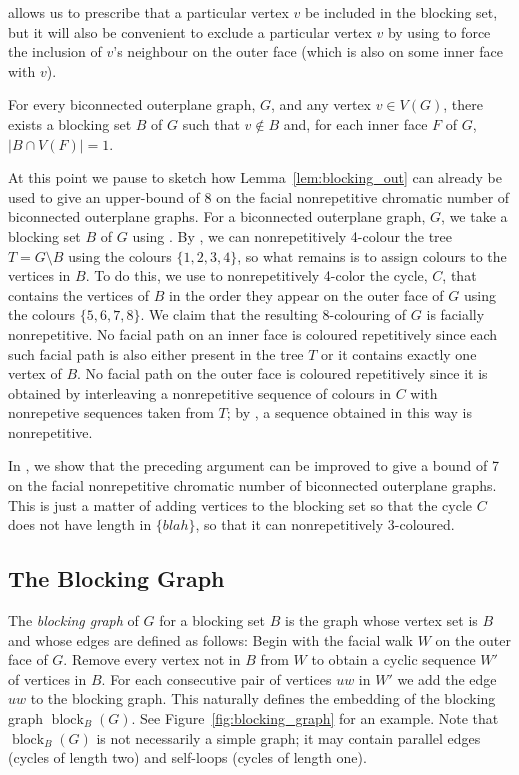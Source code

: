 \documentclass{patmorin}
\DeclareMathOperator{\block}{block}
\begin{document}
 allows us to prescribe that a particular vertex
$v$ be included in the blocking set, but it will also be convenient to
exclude a particular vertex $v$ by using  to force
the inclusion of $v$'s neighbour on the outer face (which is also on
some inner face with $v$).

\begin{cor}
  For every biconnected outerplane graph, $G$, and any vertex $v\in
  V(G)$, there exists a blocking set $B$ of $G$ such that $v\not\in B$ and,
  for each inner face $F$ of $G$, $|B\cap V(F)|=1$.
\end{cor}

At this point we pause to sketch how Lemma~\ref{lem:blocking_out}
can already be used to give an upper-bound of 8 on the facial
nonrepetitive chromatic number of biconnected outerplane graphs.  For a
biconnected outerplane graph, $G$, we take a blocking set $B$ of $G$
using .  By , we can nonrepetitively
4-colour the tree $T=G\setminus B$ using the colours $\{1,2,3,4\}$, so
what remains is to assign colours to the vertices in $B$.  To do this,
we use  to nonrepetitively 4-color the cycle, $C$, that
contains the vertices of $B$ in the order they appear on the outer face
of $G$ using the colours $\{5,6,7,8\}$.  We claim that the resulting
8-colouring of $G$ is facially nonrepetitive.  No facial path on an
inner face is coloured repetitively since each such facial path is also
either present in the tree $T$ or it contains exactly one vertex of $B$.
No facial path on the outer face is coloured repetitively since it is
obtained by interleaving a nonrepetitive sequence of colours in $C$
with nonrepetive sequences taken from $T$; by ,
a sequence obtained in this way is nonrepetitive.

In , we show that the preceding argument can be
improved to give a bound of 7 on the facial nonrepetitive chromatic
number of biconnected outerplane graphs. This is just a matter of adding
vertices to the blocking set so that the cycle $C$ does not have length
in $\{blah\}$, so that it can nonrepetitively 3-coloured. 

\subsection{The Blocking Graph}


The \emph{blocking graph} of $G$ for a blocking set $B$ is the graph
whose vertex set is $B$ and whose edges are defined as follows:  Begin
with the facial walk $W$ on the outer face of $G$. Remove every vertex
 not in $B$ from $W$ to obtain a cyclic sequence $W'$ of vertices in
$B$. For each consecutive pair of vertices $uw$ in $W'$ we add the edge
 $uw$ to the blocking graph.  This naturally defines the embedding of
 the blocking graph $\block_B(G)$. See Figure~\ref{fig:blocking_graph}
 for an example.   Note that $\block_B(G)$ is not necessarily a simple
graph; it may contain parallel edges (cycles of length two) and self-loops
(cycles of length one). 
\end{document}
